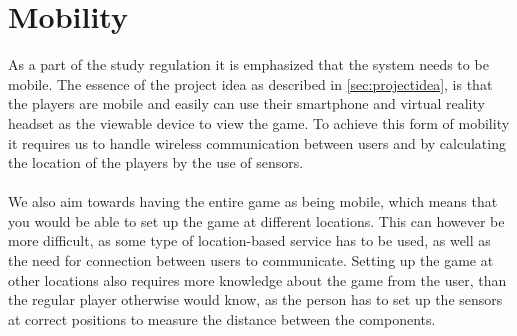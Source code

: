 \section{Mobility}\label{sec:mobility}
As a part of the study regulation it is emphasized that the system needs to be mobile.
The essence of the project idea as described in \autoref{sec:projectidea}, is that the players are mobile and easily can use their smartphone and virtual reality headset as the viewable device to view the game.
To achieve this form of mobility it requires us to handle wireless communication between users and by calculating the location of the players by the use of sensors.
\\\\
We also aim towards having the entire game as being mobile, which means that you would be able to set up the game at different locations.
This can however be more difficult, as some type of location-based service has to be used, as well as the need for connection between users to communicate.
Setting up the game at other locations also requires more knowledge about the game from the user, than the regular player otherwise would know, as the person has to set up the sensors at correct positions to measure the distance between the components.